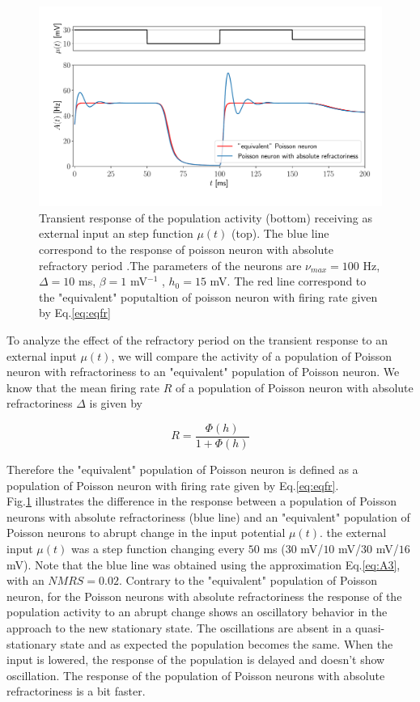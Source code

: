 \documentclass[12pt,twoside]{report}
\begin{document}
\begin{figure}[h!]
	\centering
	\includegraphics[width=0.7\linewidth]{refractory_rep.pdf}
	\caption{Transient response of the population activity (bottom) receiving as external input an step function $\mu(t)$ (top). The blue line correspond to the response of poisson neuron with absolute refractory period .The parameters of the neurons are $\nu_{max}=100$ Hz, $\Delta=10$ ms, $\beta=1$ mV$^{-1}$ , $h_0=15$ mV. The red line correspond to the "equivalent" poputaltion of poisson neuron with firing rate given by Eq.\eqref{eq:eqfr}
	}
	\label{fig:refractory_rep}
\end{figure}

To analyze the effect of the refractory period on the transient response to an external input $\mu(t)$, we will compare the activity of a population of Poisson neuron with refractoriness to an "equivalent" population of Poisson neuron. We know that the mean firing rate $R$ of a population of Poisson neuron with absolute refractoriness $\Delta$ is given by 

\begin{equation}
\label{eq:eqfr}
R=\frac{\Phi(h)}{1+\Phi(h)}
\end{equation}

Therefore the "equivalent" population of Poisson neuron is defined as a population of Poisson neuron with firing rate given by Eq.\eqref{eq:eqfr}.\\


Fig.\ref{fig:refractory_rep} illustrates the difference in the response between a population of Poisson neurons with absolute refractoriness  (blue line) and an "equivalent" population of Poisson neurons to abrupt change in the input potential $\mu(t)$. the external input $\mu(t)$ was a step function changing every $50$ ms ($30$ mV/$10$ mV/$30$ mV/$16$ mV). Note that the blue line was obtained using the approximation Eq.\ref{eq:A3}, with an $NMRS=0.02$. Contrary to the "equivalent" population of Poisson neuron, for the Poisson neurons with absolute refractoriness the response of the population activity to an abrupt change shows an oscillatory behavior in the approach to the new stationary state. The oscillations are absent in a quasi-stationary state and as expected the population becomes the same. When the input is lowered, the response of the population is delayed and doesn't show oscillation. The response of the population of Poisson neurons with absolute refractoriness is a bit faster.
\end{document}
